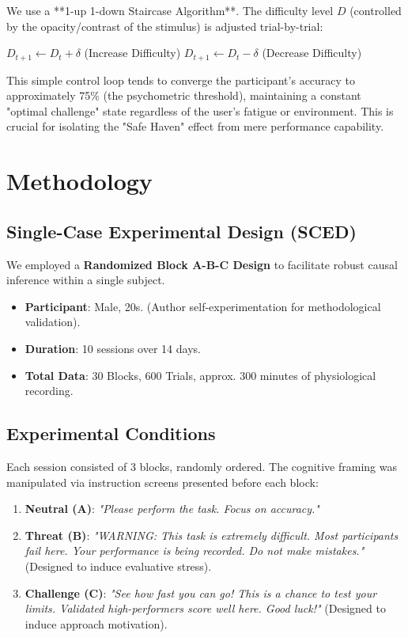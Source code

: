 \documentclass[journal]{IEEEtran}
\begin{document}
We use a **1-up 1-down Staircase Algorithm**. The difficulty level $D$ (controlled by the opacity/contrast of the stimulus) is adjusted trial-by-trial:
\begin{algorithmic}
    \STATE $D_{t+1} \leftarrow D_t + \delta$ (Increase Difficulty)
\ELSE
    \STATE $D_{t+1} \leftarrow D_t - \delta$ (Decrease Difficulty)
\ENDIF
\end{algorithmic}

This simple control loop tends to converge the participant's accuracy to approximately 75\% (the psychometric threshold), maintaining a constant "optimal challenge" state regardless of the user's fatigue or environment. This is crucial for isolating the "Safe Haven" effect from mere performance capability.

\section{Methodology}

\subsection{Single-Case Experimental Design (SCED)}
We employed a \textbf{Randomized Block A-B-C Design} to facilitate robust causal inference within a single subject.
\begin{itemize}
    \item \textbf{Participant}: Male, 20s. (Author self-experimentation for methodological validation).
    \item \textbf{Duration}: 10 sessions over 14 days.
    \item \textbf{Total Data}: 30 Blocks, 600 Trials, approx. 300 minutes of physiological recording.
\end{itemize}

\subsection{Experimental Conditions}
Each session consisted of 3 blocks, randomly ordered. The cognitive framing was manipulated via instruction screens presented before each block:

\begin{enumerate}
    \item \textbf{Neutral (A)}:
    \textit{"Please perform the task. Focus on accuracy."}
    \item \textbf{Threat (B)}:
    \textit{"WARNING: This task is extremely difficult. Most participants fail here. Your performance is being recorded. Do not make mistakes."} (Designed to induce evaluative stress).
    \item \textbf{Challenge (C)}:
    \textit{"See how fast you can go! This is a chance to test your limits. Validated high-performers score well here. Good luck!"} (Designed to induce approach motivation).
\end{enumerate}
\end{document}
